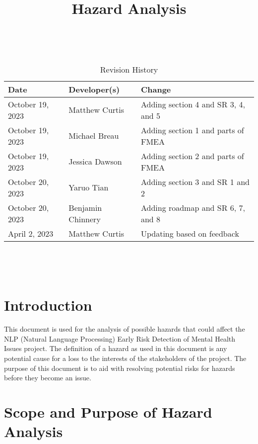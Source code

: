 \documentclass{article}
\title{Hazard Analysis\\\progname}
\author{\authname}
\date{}
\begin{document}
\maketitle
\thispagestyle{empty}


~\newpage






\begin{table}[hp]
\caption{Revision History} \label{TblRevisionHistory}
\begin{tabularx}{\textwidth}{llX}
\toprule
\textbf{Date} & \textbf{Developer(s)} & \textbf{Change}\\
\midrule
October 19, 2023 & Matthew Curtis & Adding section 4 and SR 3, 4, and 5\\
October 19, 2023 & Michael Breau & Adding section 1 and parts of FMEA\\
October 19, 2023 & Jessica Dawson & Adding section 2 and parts of FMEA\\
October 20, 2023 & Yaruo Tian & Adding section 3 and SR 1 and 2\\
October 20, 2023 & Benjamin Chinnery & Adding roadmap and SR 6, 7, and 8\\
April 2, 2023 & Matthew Curtis & Updating based on feedback\\
\bottomrule
\end{tabularx}
\end{table}


~\newpage


\tableofcontents


~\newpage




\section{Introduction}


This document is used for the analysis of possible hazards that could affect the NLP (Natural Language Processing) Early Risk Detection of Mental Health Issues project. The definition of a hazard as used in this document is any potential cause for a loss to the interests of the stakeholders of the project. The purpose of this document is to aid with resolving potential risks for hazards before they become an issue.


\section{Scope and Purpose of Hazard Analysis}
\end{document}
